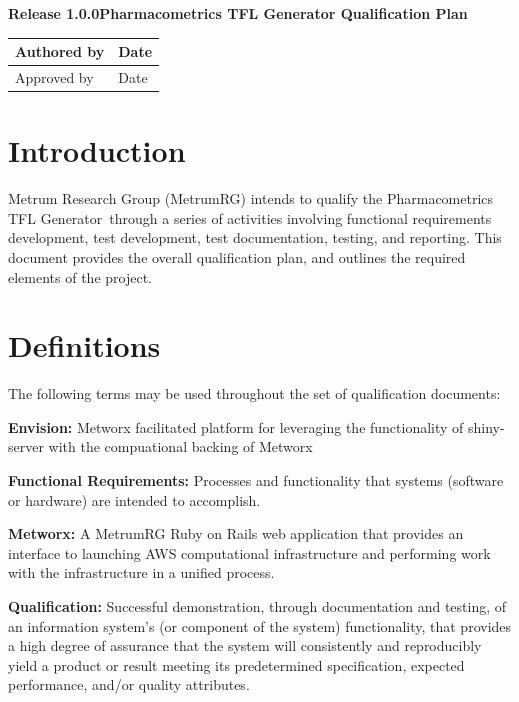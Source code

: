 \documentclass{article}
\newcommand{\optitle}{Pharmacometrics TFL Generator Qualification Plan}
\newcommand{\opnum}{Release 1.0.0}
\newcommand{\tfl}{Pharmacometrics TFL Generator}
\begin{document}
\vspace*{3cm}
{\Large{\textbf{\opnum\newline \newline \optitle}}}
\vspace{3.0cm}

\begin{tabular}{p{11.0cm}p{2.0cm}}
\hline
Authored by & Date \vspace{1cm}\\

\hline
Approved by & Date \vspace{2cm}\\

\end{tabular}


\newpage

\section*{Introduction}
Metrum Research Group (MetrumRG) intends to qualify the \tfl\ through a series of activities involving functional requirements development, test development, test documentation, testing, and reporting. This document provides the overall qualification plan, and outlines the required elements of the project.

\section*{Definitions}

The following terms may be used throughout the set of qualification documents:

{\bf Envision:} Metworx facilitated platform for leveraging the functionality of shiny-server with the compuational backing of Metworx

{\bf Functional Requirements:}  Processes and functionality that systems (software or hardware) are intended to accomplish.

{\bf Metworx:} A MetrumRG Ruby on Rails web application that provides an interface to launching  AWS computational infrastructure and performing work with the infrastructure in a unified process.

{\bf Qualification:} Successful demonstration, through documentation and testing, of an information system's (or component of the system) functionality, that provides a high degree of assurance that the system will consistently and reproducibly yield a product or result meeting its predetermined specification, expected performance, and/or quality attributes.
\end{document}
